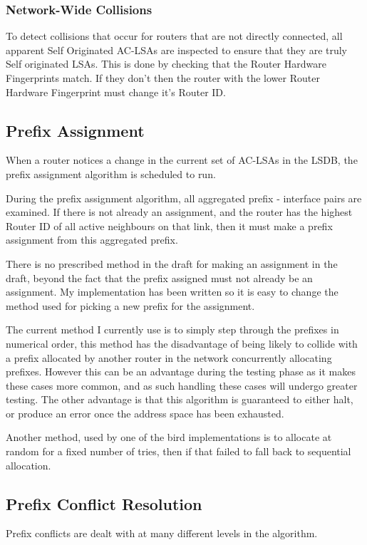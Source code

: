 \documentclass[12pt]{report}
\begin{document}
\subsubsection{Network-Wide Collisions}
To detect collisions that occur for routers that are not directly connected,
all apparent Self Originated AC-LSAs are inspected to ensure that they are
truly Self originated LSAs. This is done by checking that the Router Hardware
Fingerprints match. If they don't then the router with the lower Router
Hardware Fingerprint must change it's Router ID. 

\subsection{Prefix Assignment}
When a router notices a change in the current set of AC-LSAs in the LSDB, the
prefix assignment algorithm is scheduled to run. 

During the prefix assignment algorithm, all aggregated prefix - interface pairs
are examined. If there is not already an assignment, and the router has the
highest Router ID of all active neighbours on that link, then it must make a
prefix assignment from this aggregated prefix. 

There is no prescribed method in the draft for making an assignment in the
draft, beyond the fact that the prefix assigned must not already be an
assignment. My implementation has been written so it is easy to change the
method used for picking a new prefix for the assignment. 

The current method I currently use is to simply step through the prefixes in
numerical order, this method has the disadvantage of being likely to collide
with a prefix allocated by another router in the network concurrently allocating
prefixes.  However this can be an advantage during the testing phase as it
makes these cases more common, and as such handling these cases will undergo
greater testing. The other advantage is that this algorithm is guaranteed to
either halt, or produce an error once the address space has been exhausted. 

Another method, used by one of the bird implementations is to allocate at
random for a fixed number of tries, then if that failed to fall back to
sequential allocation. 


\subsection{Prefix Conflict Resolution}
Prefix conflicts are dealt with at many different levels in the algorithm. 
\end{document}
